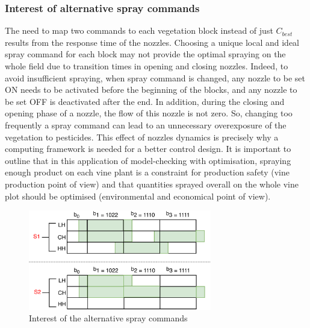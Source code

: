 \documentclass[preprint,3p,times,twocolumn]{elsarticle}
\begin{document}
\subsubsection{Interest of alternative spray commands} 
\label{sec:InterestCalt}

The need to map two commands to each vegetation block instead of just $C_{best}$ results from the response time of the nozzles. Choosing a unique local and ideal spray command for each block may not provide the optimal spraying on the whole field due to transition times in opening and closing nozzles. 
Indeed, to avoid insufficient spraying, when spray command is changed, any nozzle to be set ON needs to be activated before the beginning of the blocks, and any nozzle to be set OFF is deactivated after the end. In addition, during the closing and opening phase of a nozzle, the flow of this nozzle is not zero. So, changing too frequently a spray command can lead to an unnecessary overexposure of the vegetation to pesticides. This effect of nozzles dynamics is precisely why a computing framework is needed for a better control design. It is important to outline that in this application of model-checking with optimisation, spraying enough product on each vine plant is a constraint for production safety (vine production point of view) and that quantities sprayed overall on the whole vine plot should be optimised (environmental and economical point of view).


\begin{figure}[h!]
\begin{center}
	\includegraphics[width=8cm]{Explication.pdf}
	\caption{Interest of the alternative spray commands} 
	\label{fig:CbestCalt}
\end{center}
\end{figure}
\end{document}
